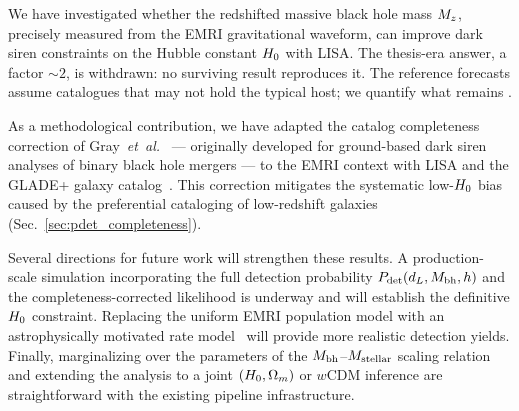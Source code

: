 
We have investigated whether the redshifted massive black hole mass
$M_z$, precisely measured from the EMRI gravitational waveform, can
improve dark siren constraints on the Hubble constant $H_0$ with LISA.
The thesis-era answer, a factor $\sim 2$, is withdrawn: no surviving
result reproduces it.  The reference forecasts assume catalogues that
may not hold the typical host; we quantify what remains
.

As a methodological contribution, we have adapted the catalog
completeness correction of
Gray~\emph{et~al.}~\cite{Gray:2019ksv} --- originally developed for
ground-based dark siren analyses of binary black hole mergers --- to
the EMRI context with LISA and the GLADE+ galaxy
catalog~\cite{Dalya:2021ewn}.  This correction mitigates the
systematic low-$H_0$ bias caused by the preferential cataloging of
low-redshift galaxies (Sec.~\ref{sec:pdet_completeness}).

Several directions for future work will strengthen these results.
A production-scale simulation incorporating the full detection
probability $P_\mathrm{det}(d_L, M_\mathrm{bh}, h)$ and the completeness-corrected
likelihood is underway and will establish the definitive $H_0$
constraint.  Replacing the uniform EMRI population model with an
astrophysically motivated rate model~\cite{Babak:2017tow} will
provide more realistic detection yields.  Finally, marginalizing over
the parameters of the $M_\mathrm{bh}$--$M_\mathrm{stellar}$ scaling
relation~\cite{Reines:2015moa} and extending the analysis to a joint
$(H_0, \Omega_m)$ or $w$CDM inference are straightforward with the
existing pipeline infrastructure.
